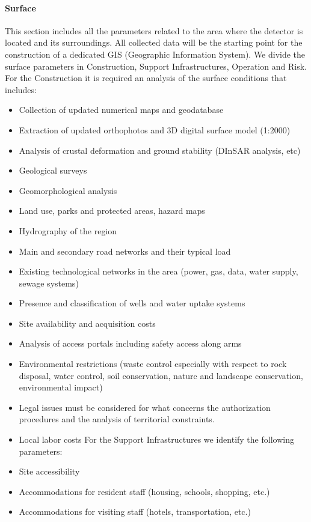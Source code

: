 \paragraph{Surface} This section includes all the parameters related to the area where the detector is located and its surroundings. All collected data will be the starting point for the construction of a dedicated GIS (Geographic Information System). We divide the surface parameters in Construction, Support Infrastructures, Operation and Risk. For the Construction it is required an analysis of the surface conditions that includes: 
\begin{itemize}
\item	Collection of updated numerical maps and geodatabase 
\item	Extraction of updated orthophotos and 3D digital surface model (1:2000)
\item	Analysis of crustal deformation and ground stability (DInSAR analysis, etc)
\item	Geological surveys
\item	Geomorphological analysis
\item	Land use, parks and protected areas, hazard maps
\item	Hydrography of the region
\item	Main and secondary road networks and their typical load
\item	Existing technological networks in the area (power, gas, data, water supply, sewage systems)
\item	Presence and classification of wells and water uptake systems
\item	Site availability and acquisition costs
\item	Analysis of access portals including safety access along arms
\item	Environmental restrictions (waste control especially with respect to rock disposal, water control, soil conservation, nature and landscape conservation, environmental impact)
\item	Legal issues must be considered for what concerns the authorization procedures and the analysis of territorial constraints.
\item	Local labor costs
For the Support Infrastructures we identify the following parameters:
\item	Site accessibility 
\item	Accommodations for resident staff (housing, schools, shopping, etc.) 
\item	Accommodations for visiting staff (hotels, transportation, etc.)

\end{itemize}

